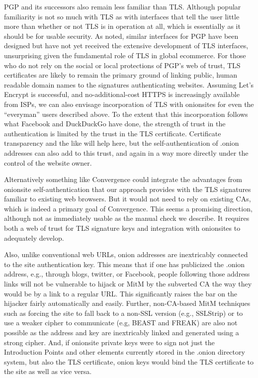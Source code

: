 \documentclass[10pt, conference, compsocconf]{styles/IEEEtran}
\begin{document}
PGP and its successors also remain less familiar than TLS. Although
popular familiarity is not so much with TLS as with interfaces that tell the
user little more than whether or not TLS is in operation at all,
which is essentially as it should be for usable security. As
noted, similar interfaces for PGP have been designed but have not yet
received the extensive development of TLS interfaces, unsurprising
given the fundamental role of TLS in global ecommerce.  For those who
do not rely on the social or local protections of PGP's web of trust,
TLS certificates are likely to remain the primary ground of linking
public, human readable domain names to the signatures authenticating
websites. Assuming Let's Encrypt is successful, and no-additional-cost
HTTPS is increasingly available from ISPs, we can also envisage
incorporation of TLS with onionsites for even the ``everyman'' users
described above.  To the extent that this incorporation follows what
Facebook and DuckDuckGo have done, the strength of trust in the
authentication is limited by the trust in the TLS
certificate. Certificate transparency and the like will help here, but
the self-authentication of .onion addresses can also add to this
trust, and again in a way more directly under the control of the
website owner. 

Alternatively something like Convergence could integrate the
advantages from onionsite self-authentication that our approach
provides with the TLS signatures familiar to existing web
browsers. But it would not need to rely on existing CAs, which is
indeed a primary goal of Convergence. This seems a promising
direction, although not as immediately usable as the manual check
we describe. It requires both a web of trust for TLS
signature keys and integration with onionsites to adequately develop.

Also, unlike conventional web URLs, onion addresses are inextricably
connected to the site authentication key. This means that if one has
publicized the .onion address, e.g., through blogs, twitter, or
Facebook, people following those address links will not be vulnerable
to hijack or MitM by the subverted CA the way they would be by a link
to a regular URL\@. This significantly raises the bar on the hijacker
fairly automatically and easily. Further, non-CA-based MitM techniques
such as forcing the site to fall back to a non-SSL version (e.g.,
SSLStrip) or to use a weaker cipher to communicate (e.g, BEAST and
FREAK) are also not possible as the address and key are inextricably
linked and generated using a strong cipher. And, if onionsite private
keys were to sign not just the Introduction Points and other elements
currently stored in the .onion directory system, but also the TLS
certificate, onion keys would bind the TLS certificate to the site as
well as vice versa. 
\end{document}
